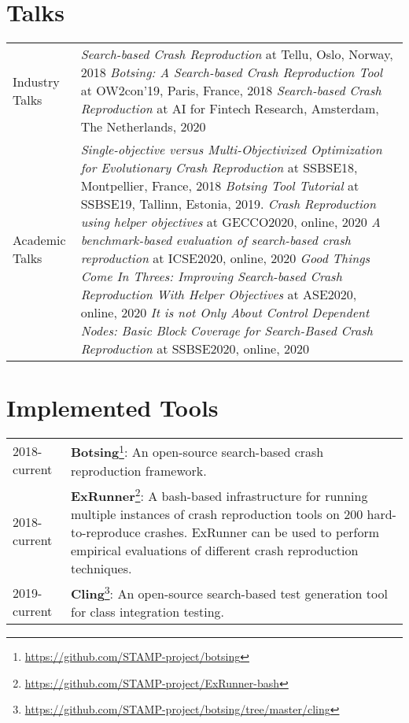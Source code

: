 \section*{Talks}
\begin{longtable}{p{} p{}}
    Industry Talks & \textit{Search-based Crash Reproduction} at Tellu, Oslo, Norway, 2018\newline \newline
    \textit{Botsing: A Search-based Crash Reproduction Tool} at OW2con'19, Paris, France, 2018\newline \newline
    \textit{Search-based Crash Reproduction} at AI for Fintech Research, Amsterdam, The Netherlands, 2020 \\

    Academic Talks & \textit{Single-objective versus Multi-Objectivized Optimization for Evolutionary Crash Reproduction} at SSBSE18, Montpellier, France, 2018 \newline \newline
    \textit{Botsing Tool Tutorial} at SSBSE19, Tallinn, Estonia, 2019. \newline \newline
    \textit{Crash Reproduction using helper objectives} at GECCO2020, online, 2020 \newline \newline
    \textit{A benchmark-based evaluation of search-based crash reproduction} at ICSE2020, online, 2020 \newline \newline
    \textit{Good Things Come In Threes: Improving Search-based Crash Reproduction With Helper Objectives} at ASE2020, online, 2020 \newline \newline
    \textit{It is not Only About Control Dependent Nodes: Basic Block Coverage for Search-Based Crash Reproduction} at SSBSE2020, online, 2020
\end{longtable}

\section*{Implemented Tools}

\begin{longtable}{p{} p{}}
 2018-current & \textbf{Botsing}\footnote{\url{https://github.com/STAMP-project/botsing}}: An open-source search-based crash reproduction framework. \\
 2018-current & \textbf{ExRunner}\footnote{\url{https://github.com/STAMP-project/ExRunner-bash}}: A bash-based infrastructure for running multiple instances of crash reproduction tools on 200 hard-to-reproduce crashes. ExRunner can be used to perform empirical evaluations of different crash reproduction techniques.\\
 2019-current & \textbf{Cling}\footnote{\url{https://github.com/STAMP-project/botsing/tree/master/cling}}: An open-source search-based test generation tool for class integration testing.\\
\end{longtable}

